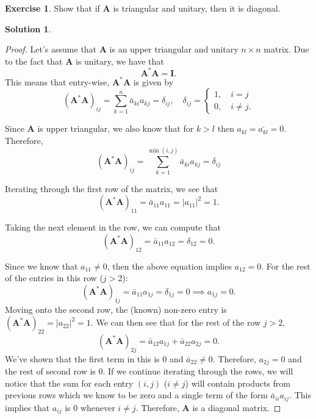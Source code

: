 \documentclass[12pt]{article}
\newcommand{\abs}[1]{ \left| #1 \right| }
\renewcommand{\vec}[1]{\mathbf{#1}}
\theoremstyle{definition}
\newtheorem{exer}{Exercise}
\newtheorem{sol}{Solution}
\theoremstyle{remark}
\begin{document}
\begin{exer}
    Show that if $\vec{A}$ is triangular and unitary, then it is diagonal.
\end{exer}

\begin{sol}\leavevmode

    \begin{proof}
Let's assume that $\vec{A}$ is an upper triangular and unitary $n\times n$ matrix. Due to the fact that $\vec{A}$ is unitary, we have that
\begin{equation}
    \vec{A}^*\vec{A} = \vec{I}.
\end{equation}
This means that entry-wise, $\vec{A}^*\vec{A}$ is given by
\begin{equation}
    (\vec{A}^*\vec{A})_{ij} = \sum_{k=1}^{n} \bar{a}_{ki}a_{kj}= \delta_{ij}, \quad \delta_{ij} = \begin{cases}
        1, \quad i = j \\
        0, \quad i \neq j.
    \end{cases}
\end{equation}

Since $\vec{A}$ is upper triangular, we also know that for $k>l$ then $a_{kl}=\bar{a_{kl}}=0$. Therefore,
\begin{equation}
    (\vec{A}^*\vec{A})_{ij} = \sum_{k=1}^{\min(i,j)} \bar{a}_{ki}a_{kj}= \delta_{ij}
\end{equation}

Iterating through the first row of the matrix, we see that
\begin{equation}
    (\vec{A}^*\vec{A})_{11} = \bar{a}_{11}a_{11} = \abs{a_{11}}^2 = 1.
\end{equation}

Taking the next element in the row, we can compute that
\begin{equation}
    (\vec{A}^*\vec{A})_{12} = \bar{a}_{11}a_{12} = \delta_{12} = 0.
\end{equation}

Since we know that $a_{11} \neq 0$, then the above equation implies $a_{12} = 0$. For the rest of the entries in this row ($j>2$):
\begin{equation}
    (\vec{A}^*\vec{A})_{1j} = \bar{a}_{11}a_{1j} = \delta_{1j} = 0 \implies a_{1j} =0.
\end{equation}
Moving onto the second row, the (known) non-zero entry is $(\vec{A}^*\vec{A})_{22} = \abs{a_{22}}^2 = 1$. We can then see that for the rest of the row $j > 2$,
\begin{equation}
    (\vec{A}^*\vec{A})_{2j} = \bar{a}_{12}a_{1j} + \bar{a}_{22}a_{2j} = 0.
\end{equation}
We've shown that the first term in this is 0 and $\bar{a}_{22} \neq 0$. Therefore, $a_{2j}=0$ and the rest of second row is 0. If we continue iterating through the rows, we will notice that the sum for each entry $(i,j)$ ($i\neq j$) will contain products from previous rows which we know to be zero and a single term of the form $\bar{a}_{ii}a_{ij}$. This implies that $a_{ij}$ is 0 whenever $i\neq j$. Therefore, $\vec{A}$ is a diagonal matrix.


\end{proof}
\end{sol}
\end{document}
